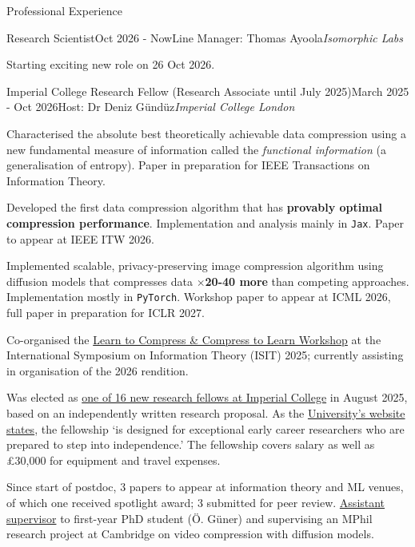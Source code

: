 \documentclass{resume} %
\begin{document}
\begin{rSection}{Professional Experience}
\begin{rSubsection}{Research Scientist}{Oct 2026 - Now}{Line Manager: Thomas Ayoola}{\textit{Isomorphic Labs}}
  \item Starting exciting new role on 26 Oct 2026.
\end{rSubsection}
\begin{rSubsection}{Imperial College Research Fellow (Research Associate until
    July 2025)}{March 2025 - Oct 2026}{Host: Dr Deniz G{\"u}nd{\"u}z}{\textit{Imperial College London}}
\item Characterised the absolute best theoretically achievable data compression using a new fundamental measure of information called the
  \textit{functional information} (a generalisation of entropy). Paper in
  preparation for IEEE Transactions on Information Theory.
\item Developed the first data compression algorithm that has \textbf{provably
    optimal compression performance}. Implementation and analysis mainly in \texttt{Jax}. Paper to appear at IEEE ITW 2026.
\item Implemented scalable, privacy-preserving image compression algorithm using diffusion
  models that compresses data \textbf{$\times$20-40 more} than competing approaches.
  Implementation mostly in \texttt{PyTorch}.
  Workshop paper to appear at ICML 2026, full paper in preparation for ICLR 2027.
\item Co-organised the \href{https://learn-to-compress-workshop-isit.github.io}{Learn to Compress \& Compress to Learn
Workshop} at the International Symposium on Information Theory (ISIT) 2025;
currently assisting in organisation of the 2026 rendition.
\item Was elected as \href{https://www.imperial.ac.uk/research-and-innovation/research-office/funder-information/research-fellowships/irf/our-cohorts/}{one of 16 new research fellows at Imperial College} in August 2025, based
  on an independently written research proposal.
  As the \href{https://www.imperial.ac.uk/research-and-innovation/research-office/funder-information/research-fellowships/irf/}{University's website states}, the fellowship `is designed for exceptional early career researchers who are prepared to step into independence.'
  The fellowship covers salary as well as £30,000 for equipment and travel expenses.
\item Since start of postdoc, 3 papers to appear at information theory and ML
  venues, of which one received spotlight award; 3
  submitted for peer review.
  \href{https://www.imperial.ac.uk/early-career-researcher-institute/learning-and-development/cornerstone/supervisors-guidebook/cpd/assistant-supervisors/}{Assistant supervisor} to first-year PhD student ({\"O}. G{\"u}ner) and
  supervising an MPhil research project at Cambridge on video
  compression with diffusion models.
\end{rSubsection}


\end{rSection}
\end{document}
